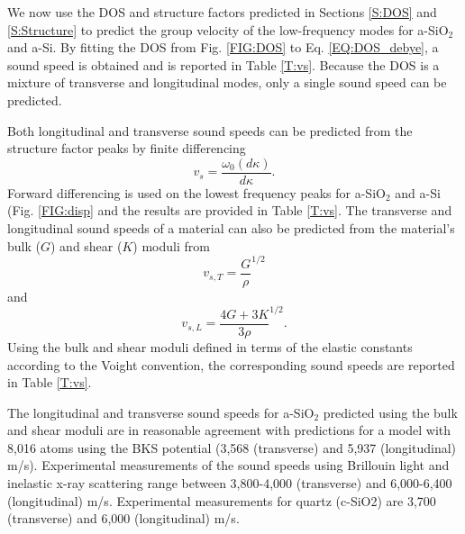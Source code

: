 \documentclass[aps,prb,twocolumn,superscriptaddress,footinbib,amsmath,amssymb,floatfix]{revtex4}
\begin{document}
We now use the DOS and structure factors predicted in 
Sections \ref{S:DOS} and \ref{S:Structure} to 
predict the group velocity of the low-frequency modes for 
a-SiO$_2$ and a-Si. By fitting the DOS 
from Fig. \ref{FIG:DOS} to Eq. \eqref{EQ:DOS_debye}, 
a sound speed is obtained and is  
reported in Table \ref{T:vs}. Because the DOS is a mixture of 
transverse and longitudinal modes, only a single sound speed can be 
predicted. 

Both longitudinal and transverse sound speeds can be predicted from 
the structure factor peaks by finite 
differencing 
\begin{equation}\label{EQ:vs_dwdk}
v_{s} = \frac{\omega_0(d\kappa)}{d\kappa}.
\end{equation}
Forward differencing is used on the lowest frequency peaks for a-SiO$_2$ 
and a-Si (Fig. \ref{FIG:disp} and the results are provided 
in Table \ref{T:vs}. 
The transverse and longitudinal sound speeds of a material can 
also be predicted from the material's bulk ($G$) and 
shear ($K$) moduli from 
\begin{equation}\label{EQ:vs_T_elas}
v_{s,T} = \frac{G}{\rho}^{1/2}
\end{equation}
and 
\begin{equation}\label{EQ:vs_L_elas}
v_{s,L} = \frac{4G + 3K}{3\rho}^{1/2}.
\end{equation}
Using the bulk and shear moduli defined in terms of the elastic 
constants according to the Voight convention,\cite{gale_general_2003}  
the corresponding sound speeds are reported in Table \ref{T:vs}. 

The longitudinal and transverse sound speeds for 
a-SiO$_2$ predicted using the bulk and shear moduli are in reasonable 
agreement with predictions for a model with 
8,016 atoms using the BKS potential 
(3,568 (transverse) and 5,937 (longitudinal) m/s).
\cite{horbach_high_2001} Experimental measurements of the 
sound speeds using Brillouin light and inelastic x-ray 
scattering range between 3,800-4,000 (transverse) and 
6,000-6,400 (longitudinal) m/s.
\cite{vacher_ultrasonic_1981,benassi_evidence_1996,
ruocco_high-frequency_2001,polian_elastic_2002,
ruzicka_evidence_2004} Experimental measurements for 
quartz (c-SiO2) are 3,700 (transverse) and 6,000 (longitudinal) 
m/s.\cite{touloukian_thermophysical_1970,kaviany_principles_2001}
\end{document}
